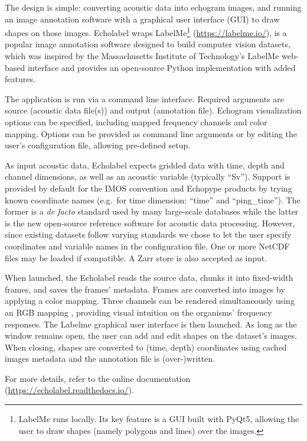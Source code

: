 \documentclass[
  10pt,
  letterpaper,
]{article}
\begin{document}
The design is simple: converting acoustic data into echogram images, and
running an image annotation software with a graphical user interface
(GUI) to draw shapes on those images. Echolabel wraps LabelMe\footnote{LabelMe
  runs locally. Its key feature is a GUI built with PyQt5, allowing the
  user to draw shapes (namely polygons and lines) over the images.}
(\url{https://labelme.io/}), is a popular image annotation software
designed to build computer vision datasets, which was inspired by the
Massachusetts Institute of Technology's LabelMe web-based interface
\citep{russell2008} and provides an open-source Python implementation
with added features.

The application is run via a command line interface. Required arguments
are source (acoustic data file(s)) and output (annotation file).
Echogram visualization options can be specified, including mapped
frequency channels and color mapping. Options can be provided as command
line arguments or by editing the user's configuration file, allowing
pre-defined setup.

As input acoustic data, Echolabel expects gridded data with time, depth
and channel dimensions, as well as an acoustic variable (typically
``Sv''). Support is provided by default for the IMOS convention
\citep{kunnath2018} and Echopype products by trying known coordinate
names (e.g.~for time dimension: ``time'' and ``ping\_time''). The former
is a \emph{de facto} standard used by many large-scale databases while
the latter is the new open-source reference software for acoustic data
processing. However, since existing datasets follow varying standards we
chose to let the user specify coordinates and variable names in the
configuration file. One or more NetCDF files may be loaded if
compatible. A Zarr store is also accepted as input.

When launched, the Echolabel reads the source data, chunks it into
fixed-width frames, and saves the frames' metadata. Frames are converted
into images by applying a color mapping. Three channels can be rendered
simultaneously using an RGB mapping \citep{ariza2022}, providing visual
intuition on the organisms' frequency responses. The Labelme graphical
user interface is then launched. As long as the window remains open, the
user can add and edit shapes on the dataset's images. When closing,
shapes are converted to (time, depth) coordinates using cached images
metadata and the annotation file is (over-)written.

For more details, refer to the online documentation
(\url{https://echolabel.readthedocs.io/}).
\end{document}
